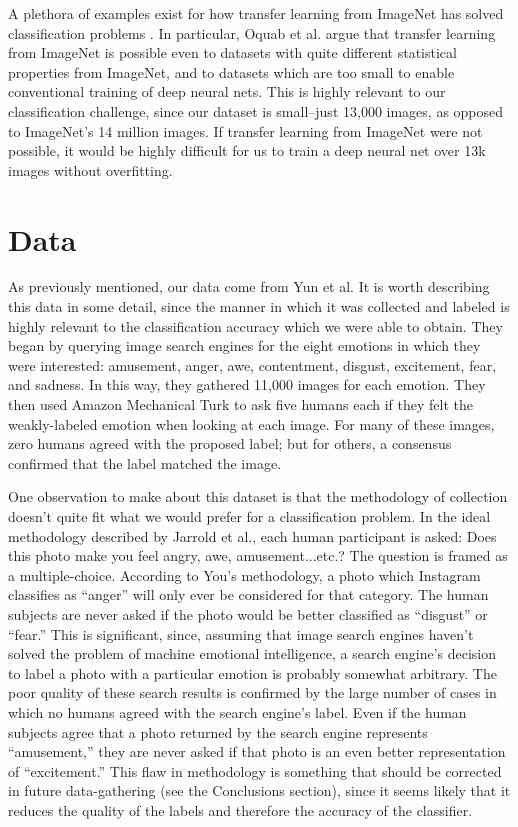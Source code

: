 \documentclass[10pt,twocolumn,letterpaper]{article}
\begin{document}
A plethora of examples exist for how transfer learning from ImageNet has solved  classification problems \cite{transferexampleprimary}\cite{transferexample1}\cite{transferexample2}. In particular, Oquab et al.\cite{transferexampleprimary} argue that transfer learning from ImageNet is possible even to datasets with quite different statistical properties from ImageNet, and to datasets which are too small to enable conventional training of deep neural nets. This is highly relevant to our classification challenge, since our dataset is small--just 13,000 images, as opposed to ImageNet's 14 million images. If transfer learning from ImageNet were not possible, it would be highly difficult for us to train a deep neural net over 13k images without overfitting.

\section{Data}
As previously mentioned, our data come from Yun et al\cite{ourdata}. It is worth describing this data in some detail, since the manner in which it was collected and labeled is highly relevant to the classification accuracy which we were able to obtain. They began by querying image search engines for the eight emotions in which they were interested: amusement, anger, awe, contentment, disgust, excitement, fear, and sadness. In this way, they gathered 11,000 images for each emotion. They then used Amazon Mechanical Turk to ask five humans each if they felt the weakly-labeled emotion when looking at each image. For many of these images, zero humans agreed with the proposed label; but for others, a consensus confirmed that the label matched the image.

One observation to make about this dataset is that the methodology of collection doesn't quite fit what we would prefer for a classification problem. In the ideal methodology described by Jarrold et al.\cite{methodologyproposed}, each human participant is asked: Does this photo make you feel angry, awe, amusement...etc.? The question is framed as a multiple-choice. According to You's methodology, a photo which Instagram classifies as ``anger'' will only ever be considered for that category. The human subjects are never asked if the photo would be better classified as ``disgust'' or ``fear.'' This is significant, since, assuming that image search engines haven't solved the problem of machine emotional intelligence, a search engine's decision to label a photo with a particular emotion is probably somewhat arbitrary. The poor quality of these search results is confirmed by the large number of cases in which no humans agreed with the search engine's label. Even if the human subjects agree that a photo returned by the search engine represents ``amusement,'' they are never asked if that photo is an even better representation of ``excitement.'' This flaw in methodology is something that should be corrected in future data-gathering (see the Conclusions section), since it seems likely that it reduces the quality of the labels and therefore the accuracy of the classifier.
\end{document}
